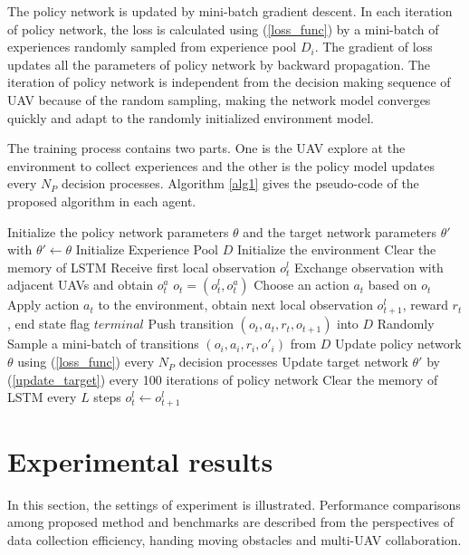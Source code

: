 \documentclass[journal]{IEEEtran}
\begin{document}
The policy network is updated by mini-batch gradient descent. In each iteration of policy network, the loss is calculated using (\ref{loss_func}) by a mini-batch of experiences randomly sampled from experience pool $D_i$. The gradient of loss updates all the parameters of policy network by backward propagation. The iteration of policy network is independent from the decision making sequence of UAV because of the random sampling, making the network model converges quickly and adapt to the randomly initialized environment model. 

The training process contains two parts. One is the UAV explore at the environment to collect experiences and the other is the policy model updates every $N_P$ decision processes. Algorithm \ref{alg1} gives the pseudo-code of the proposed algorithm in each agent. 

\begin{algorithm}[h]	
	Initialize the policy network parameters $\theta$ and the target network parameters $\theta '$ with $\theta '\gets \theta$\;
	Initialize Experience Pool $D$\;
	{
		Initialize the environment\;
        Clear the memory of LSTM\;
		Receive first local observation $o^l_{t}$\;
		{
            Exchange observation with adjacent UAVs and obtain $o^a_t$\;
            $o_t=\left(o^l_{t}, o^a_t\right)$\;
			Choose an action $a_{t}$ based on $o_t$\;
            Apply action $a_{t}$ to the environment, obtain next local observation $o^l_{t+1}$, reward $r_{t}$, end state flag $terminal$\;
            Push transition $(o_t, a_t, r_t, o_{t+1})$ into $D$\;
            {
                Randomly Sample a mini-batch of transitions $(o_i, a_i, r_i, o'_{i})$ from $D$\;
                Update policy network $\theta$ using (\ref{loss_func}) every $N_P$ decision processes\;
                Update target network $\theta '$ by (\ref{update_target}) every 100 iterations of policy network\;
            }
            Clear the memory of LSTM every $L$ steps\;
            $o^l_{t} \gets o^l_{t+1}$\;
		}
	}
	\caption{Proposed algorithm}\label{alg1}
\end{algorithm}

\section{Experimental results}\label{Experiments}
In this section, the settings of experiment is illustrated. Performance comparisons among proposed method and benchmarks are described from the perspectives of data collection efficiency, handing moving obstacles and multi-UAV collaboration. 
\end{document}
